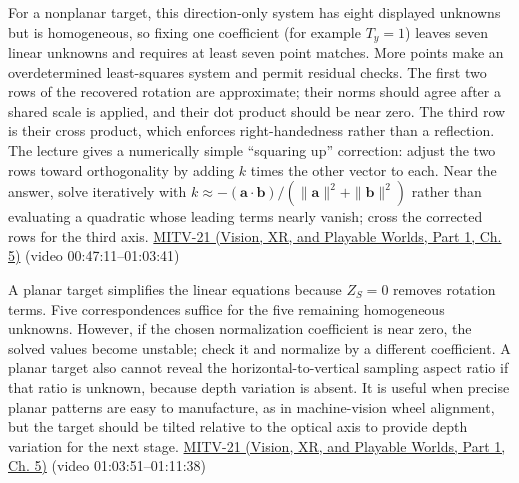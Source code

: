 For a nonplanar target, this direction-only system has eight displayed unknowns but is homogeneous, so fixing one coefficient (for example \(T_y=1\)) leaves seven linear unknowns and requires at least seven point matches. More points make an overdetermined least-squares system and permit residual checks. The first two rows of the recovered rotation are approximate; their norms should agree after a shared scale is applied, and their dot product should be near zero. The third row is their cross product, which enforces right-handedness rather than a reflection. The lecture gives a numerically simple ``squaring up'' correction: adjust the two rows toward orthogonality by adding \(k\) times the other vector to each. Near the answer, solve iteratively with \(k\approx-(\mathbf{a}\cdot\mathbf{b})/(\|\mathbf{a}\|^2+\|\mathbf{b}\|^2)\) rather than evaluating a quadratic whose leading terms nearly vanish; cross the corrected rows for the third axis. \href{../07-Vision-XR-and-Playable-Worlds-P01/main.pdf\#nameddest=04-visual-computing-ii-ch036-mitv-21---relative-orientation-binocular-stereo-structure-quadrics-calibration-reprojection}{MITV-21 (Vision, XR, and Playable Worlds, Part 1, Ch. 5)} (video 00:47:11--01:03:41)

A planar target simplifies the linear equations because \(Z_S=0\) removes rotation terms. Five correspondences suffice for the five remaining homogeneous unknowns. However, if the chosen normalization coefficient is near zero, the solved values become unstable; check it and normalize by a different coefficient. A planar target also cannot reveal the horizontal-to-vertical sampling aspect ratio if that ratio is unknown, because depth variation is absent. It is useful when precise planar patterns are easy to manufacture, as in machine-vision wheel alignment, but the target should be tilted relative to the optical axis to provide depth variation for the next stage. \href{../07-Vision-XR-and-Playable-Worlds-P01/main.pdf\#nameddest=04-visual-computing-ii-ch036-mitv-21---relative-orientation-binocular-stereo-structure-quadrics-calibration-reprojection}{MITV-21 (Vision, XR, and Playable Worlds, Part 1, Ch. 5)} (video 01:03:51--01:11:38)

